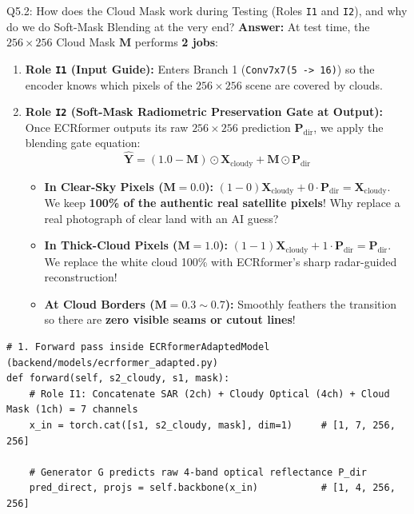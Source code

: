 \documentclass[11pt,a4paper]{article}
\begin{document}
\begin{qbox}{Q5.2: How does the Cloud Mask work during Testing (Roles \texttt{I1} and \texttt{I2}), and why do we do Soft-Mask Blending at the very end?}
\textbf{Answer:}
At test time, the $256\times 256$ Cloud Mask $\mathbf{M}$ performs \textbf{2 jobs}:
\begin{enumerate}[leftmargin=18pt]
    \item \textbf{Role \texttt{I1} (Input Guide):} Enters Branch 1 (\texttt{Conv7x7(5 -> 16)}) so the encoder knows which pixels of the $256\times 256$ scene are covered by clouds.
    \item \textbf{Role \texttt{I2} (Soft-Mask Radiometric Preservation Gate at Output):}
    Once ECRformer outputs its raw $256\times 256$ prediction $\mathbf{P}_{\text{dir}}$, we apply the blending gate equation:
    $$\hat{\mathbf{Y}} = (1.0 - \mathbf{M}) \odot \mathbf{X}_{\text{cloudy}} + \mathbf{M} \odot \mathbf{P}_{\text{dir}}$$
    \begin{itemize}
        \item \textbf{In Clear-Sky Pixels ($\mathbf{M} = 0.0$):} $(1 - 0)\mathbf{X}_{\text{cloudy}} + 0\cdot \mathbf{P}_{\text{dir}} = \mathbf{X}_{\text{cloudy}}$. We keep \textbf{100\% of the authentic real satellite pixels}! Why replace a real photograph of clear land with an AI guess?
        \item \textbf{In Thick-Cloud Pixels ($\mathbf{M} = 1.0$):} $(1 - 1)\mathbf{X}_{\text{cloudy}} + 1\cdot \mathbf{P}_{\text{dir}} = \mathbf{P}_{\text{dir}}$. We replace the white cloud 100\% with ECRformer's sharp radar-guided reconstruction!
        \item \textbf{At Cloud Borders ($\mathbf{M} = 0.3 \sim 0.7$):} Smoothly feathers the transition so there are \textbf{zero visible seams or cutout lines}!
    \end{itemize}
\end{enumerate}

\begin{lstlisting}[caption={Complete Inference Forward Pass, Soft-Mask Blending (Role I2), and PNG Image Conversion}]
# 1. Forward pass inside ECRformerAdaptedModel (backend/models/ecrformer_adapted.py)
def forward(self, s2_cloudy, s1, mask):
    # Role I1: Concatenate SAR (2ch) + Cloudy Optical (4ch) + Cloud Mask (1ch) = 7 channels
    x_in = torch.cat([s1, s2_cloudy, mask], dim=1)     # [1, 7, 256, 256]

    # Generator G predicts raw 4-band optical reflectance P_dir
    pred_direct, projs = self.backbone(x_in)           # [1, 4, 256, 256]


\end{lstlisting}
\end{qbox}
\end{document}
